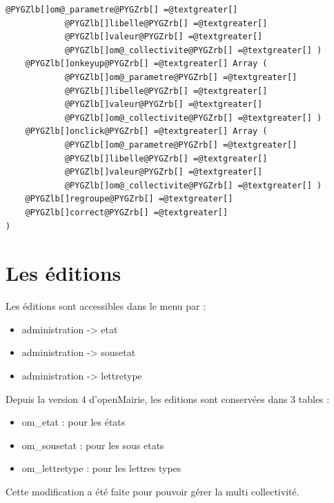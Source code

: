 \documentclass[letterpaper,10pt,french]{manual}
\begin{document}
\begin{Verbatim}[commandchars=@\[\]]
            @PYGZlb[]om@_parametre@PYGZrb[] =@textgreater[]
            @PYGZlb[]libelle@PYGZrb[] =@textgreater[]
            @PYGZlb[]valeur@PYGZrb[] =@textgreater[]
            @PYGZlb[]om@_collectivite@PYGZrb[] =@textgreater[] )
    @PYGZlb[]onkeyup@PYGZrb[] =@textgreater[] Array (
            @PYGZlb[]om@_parametre@PYGZrb[] =@textgreater[]
            @PYGZlb[]libelle@PYGZrb[] =@textgreater[]
            @PYGZlb[]valeur@PYGZrb[] =@textgreater[]
            @PYGZlb[]om@_collectivite@PYGZrb[] =@textgreater[] )
    @PYGZlb[]onclick@PYGZrb[] =@textgreater[] Array (
            @PYGZlb[]om@_parametre@PYGZrb[] =@textgreater[]
            @PYGZlb[]libelle@PYGZrb[] =@textgreater[]
            @PYGZlb[]valeur@PYGZrb[] =@textgreater[]
            @PYGZlb[]om@_collectivite@PYGZrb[] =@textgreater[] )
    @PYGZlb[]regroupe@PYGZrb[] =@textgreater[]
    @PYGZlb[]correct@PYGZrb[] =@textgreater[]
)
\end{Verbatim}

\resetcurrentobjects
\hypertarget{--doc-framework/edition}{}

\hypertarget{edition}{}\section{Les éditions}

Les éditions sont accessibles dans le menu par :
\begin{itemize}
\item {} 
administration -\textgreater{} etat

\item {} 
administration -\textgreater{} sousetat

\item {} 
administration -\textgreater{} lettretype

\end{itemize}

Depuis la version 4 d'openMairie, les editions sont conservées dans 3 tables :
\begin{itemize}
\item {} 
om\_etat : pour les états

\item {} 
om\_sousetat : pour les sous etats

\item {} 
om\_lettretype : pour les lettres types

\end{itemize}

Cette modification a été faite pour pouvoir gérer la multi collectivité.
\end{document}
